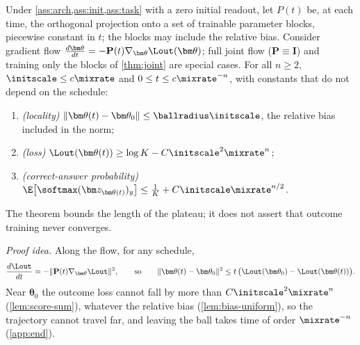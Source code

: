 \begin{theorem}
\label{thm:outcome-end}
Under \cref{ass:arch,ass:init,ass:task} with a zero initial readout, let $P(t)$ be, at each time, the orthogonal projection onto a set
of trainable parameter blocks, piecewise constant in $t$; the blocks may include the relative bias. Consider gradient flow
$\tfrac{d\bm\theta}{dt}=-\mathbf P(t)\nabla_{\bm\theta}\Lout(\bm\theta)$; full joint flow ($\mathbf P\equiv\mathbf I$) and training only the blocks of \cref{thm:joint} are special cases.
For all $n\ge2$, $\initscale\le c\mixrate$ and $0\le t\le c\mixrate^{-n}$, with constants that do not depend on the schedule:
\begin{enumerate}[label=(\roman*),leftmargin=*,itemsep=0pt,topsep=2pt]
\item \emph{(locality)} $\|\bm\theta(t)-\bm\theta_0\|\le\ballradius\initscale$, the relative bias included in the norm;
\item \emph{(loss)} $\Lout(\bm\theta(t))\ge\log K-C\initscale^2\mixrate^n$;
\item \emph{(correct-answer probability)} $\E\bigl[\softmax(\bm z_{\bm\theta(t)})_y\bigr]\le\frac{1}{K}+C\initscale\mixrate^{n/2}$.
\end{enumerate}
\end{theorem}
The theorem bounds the length of the plateau; it does not assert that outcome training never converges.

\emph{Proof idea.} Along the flow, for any schedule,
\[
 \frac{d\Lout}{dt}=-\|\mathbf P(t)\nabla_{\bm\theta}\Lout\|^2,
 \qquad\text{so}\qquad
 \|\bm\theta(t)-\bm\theta_0\|^2\le t\,\bigl(\Lout(\bm\theta_0)-\Lout(\bm\theta(t))\bigr).
\]
Near $\bm\theta_0$ the outcome loss cannot fall by more than $C\initscale^2\mixrate^n$ (\cref{lem:score-sum}), whatever the relative bias
(\cref{lem:bias-uniform}), so the trajectory cannot travel far, and leaving the ball takes time of order $\mixrate^{-n}$ (\cref{app:end}).

